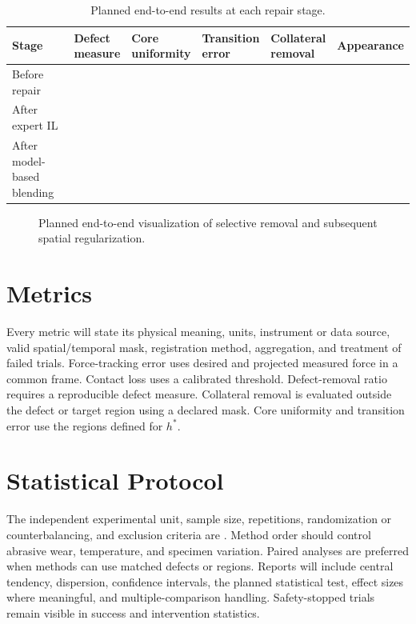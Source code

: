 \begin{table}[t]
\centering
\caption{Planned end-to-end results at each repair stage.}
\label{tab:end_to_end}
\scriptsize
\begin{tabularx}{\textwidth}{p{}XXXXX}
\toprule
Stage & \makecell{Defect\\measure} & \makecell{Core\\uniformity} & \makecell{Transition\\error} & \makecell{Collateral\\removal} & Appearance \\
\midrule
Before repair & & & & & \\
After expert IL & & & & & \\
After model-based blending & & & & & \\
\bottomrule
\end{tabularx}
\end{table}

\begin{figure}[t]
  \centering
  \caption{Planned end-to-end visualization of selective removal and subsequent spatial regularization.}
  \label{fig:end_to_end_results}
\end{figure}

\section{Metrics}
Every metric will state its physical meaning, units, instrument or data source, valid spatial/temporal mask, registration method, aggregation, and treatment of failed trials. Force-tracking error uses desired and projected measured force in a common frame. Contact loss uses a calibrated threshold. Defect-removal ratio requires a reproducible defect measure. Collateral removal is evaluated outside the defect or target region using a declared mask. Core uniformity and transition error use the regions defined for \(h^*\).

\section{Statistical Protocol}
The independent experimental unit, sample size, repetitions, randomization or counterbalancing, and exclusion criteria are . Method order should control abrasive wear, temperature, and specimen variation. Paired analyses are preferred when methods can use matched defects or regions. Reports will include central tendency, dispersion, confidence intervals, the planned statistical test, effect sizes where meaningful, and multiple-comparison handling. Safety-stopped trials remain visible in success and intervention statistics.

